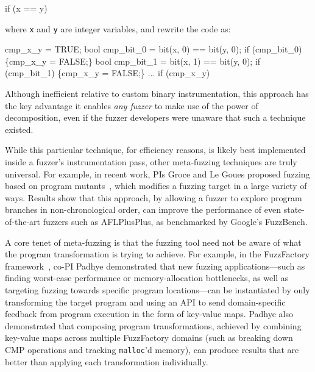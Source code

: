 \begin{code}

if (x == y)
\end{code}

\noindent where {\tt x} and {\tt y} are integer variables, and rewrite the code 
as:

\begin{code}
cmp\_x\_y = TRUE;
bool cmp\_bit\_0 = bit(x, 0) == bit(y, 0);
if (cmp\_bit\_0) \{cmp\_x\_y = FALSE;\}
bool cmp\_bit\_1 = bit(x, 1) == bit(y, 0);
if (cmp\_bit\_1) \{cmp\_x\_y = FALSE;\}
$\ldots$
if (cmp\_x\_y)
\end{code}

\noindent Although inefficient relative to custom binary instrumentation, this
approach has the key advantage it enables \emph{any fuzzer} to make use of the power of 
decomposition, even if the fuzzer developers were unaware that such a technique 
existed. 

While this particular technique, for efficiency reasons, is likely best 
implemented inside a fuzzer's instrumentation pass, other meta-fuzzing 
techniques are truly universal.  For example, in recent work, PIs Groce and Le Goues 
proposed fuzzing based on program mutants~\cite{fixme}, which modifies a fuzzing 
target in a large variety of ways.  Results show that this approach, by 
allowing a fuzzer to explore program branches in non-chronological order, can 
improve the performance of even state-of-the-art fuzzers such as AFLPlusPlus, 
as benchmarked by Google's FuzzBench.

A core tenet of meta-fuzzing is that the fuzzing tool need not be aware of what 
the program transformation is trying to achieve. For example, in the 
FuzzFactory framework~\cite{fuzzfactory}, co-PI Padhye demonstrated that new 
fuzzing applications---such as finding worst-case performance or 
memory-allocation bottlenecks, as well as targeting fuzzing towards specific 
program locations---can be instantiated by only transforming the target program 
and using an API to send domain-specific feedback from program execution in the 
form of key-value maps. Padhye also demonstrated that composing program 
transformations, achieved by combining key-value maps across multiple 
FuzzFactory domains (such as breaking down CMP operations and tracking 
\texttt{malloc}'d memory), can produce results that are better than applying 
each transformation individually.

